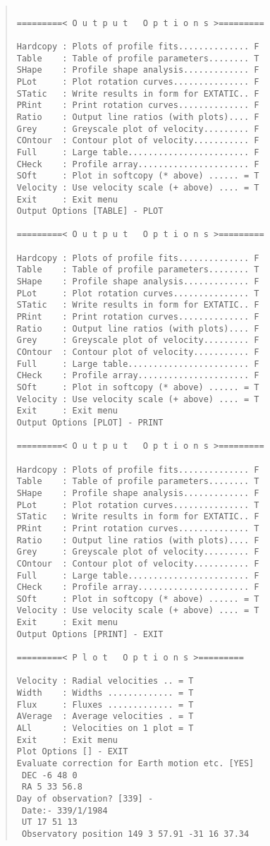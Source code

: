 \begin{quote}\begin{verbatim}
 
=========< O u t p u t   O p t i o n s >=========
 
Hardcopy : Plots of profile fits.............. F
Table    : Table of profile parameters........ T
SHape    : Profile shape analysis............. F
PLot     : Plot rotation curves............... F
STatic   : Write results in form for EXTATIC.. F
PRint    : Print rotation curves.............. F
Ratio    : Output line ratios (with plots).... F
Grey     : Greyscale plot of velocity......... F
COntour  : Contour plot of velocity........... F
Full     : Large table........................ F
CHeck    : Profile array...................... F
SOft     : Plot in softcopy (* above) ...... = T
Velocity : Use velocity scale (+ above) .... = T
Exit     : Exit menu
Output Options [TABLE] - PLOT
 
=========< O u t p u t   O p t i o n s >=========
 
Hardcopy : Plots of profile fits.............. F
Table    : Table of profile parameters........ T
SHape    : Profile shape analysis............. F
PLot     : Plot rotation curves............... T
STatic   : Write results in form for EXTATIC.. F
PRint    : Print rotation curves.............. F
Ratio    : Output line ratios (with plots).... F
Grey     : Greyscale plot of velocity......... F
COntour  : Contour plot of velocity........... F
Full     : Large table........................ F
CHeck    : Profile array...................... F
SOft     : Plot in softcopy (* above) ...... = T
Velocity : Use velocity scale (+ above) .... = T
Exit     : Exit menu
Output Options [PLOT] - PRINT
 
=========< O u t p u t   O p t i o n s >=========
 
Hardcopy : Plots of profile fits.............. F
Table    : Table of profile parameters........ T
SHape    : Profile shape analysis............. F
PLot     : Plot rotation curves............... T
STatic   : Write results in form for EXTATIC.. F
PRint    : Print rotation curves.............. T
Ratio    : Output line ratios (with plots).... F
Grey     : Greyscale plot of velocity......... F
COntour  : Contour plot of velocity........... F
Full     : Large table........................ F
CHeck    : Profile array...................... F
SOft     : Plot in softcopy (* above) ...... = T
Velocity : Use velocity scale (+ above) .... = T
Exit     : Exit menu
Output Options [PRINT] - EXIT

=========< P l o t   O p t i o n s >=========

Velocity : Radial velocities .. = T
Width    : Widths ............. = T
Flux     : Fluxes ............. = T
AVerage  : Average velocities . = T
ALl      : Velocities on 1 plot = T
Exit     : Exit menu
Plot Options [] - EXIT
Evaluate correction for Earth motion etc. [YES]
 DEC -6 48 0
 RA 5 33 56.8
Day of observation? [339] -
 Date:- 339/1/1984
 UT 17 51 13
 Observatory position 149 3 57.91 -31 16 37.34
\end{verbatim}\end{quote}

